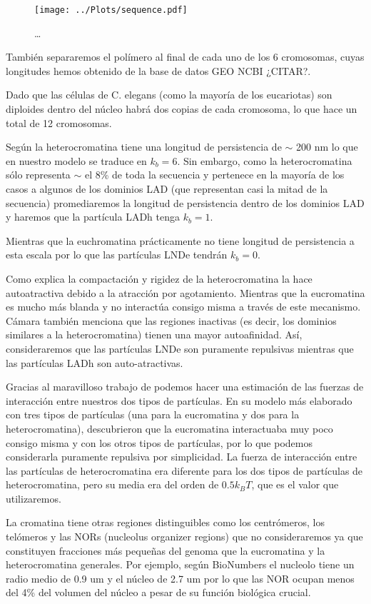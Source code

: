 \begin{figure}
    \centering
    \texttt{[image: ../Plots/sequence.pdf]}
    \caption{\dots}
    \label{fig:sequence}
\end{figure}

También separaremos el polímero al final de cada uno de los 6 cromosomas, cuyas longitudes hemos obtenido de la base de datos GEO NCBI ¿CITAR?.

Dado que las células de C. elegans (como la mayoría de los eucariotas) son diploides dentro del núcleo habrá dos copias de cada cromosoma, lo que hace un total de 12 cromosomas.

Según \cite{Bystricky2004} la heterocromatina tiene una longitud de persistencia de $\sim$ 200 nm lo que en nuestro modelo se traduce en $k_b=6$. Sin embargo, como la heterocromatina sólo representa $\sim$ el 8\% de toda la secuencia y pertenece en la mayoría de los casos a algunos de los dominios LAD (que representan casi la mitad de la secuencia) promediaremos la longitud de persistencia dentro de los dominios LAD y haremos que la partícula LADh tenga $k_b=1$.

Mientras que la euchromatina prácticamente no tiene longitud de persistencia a esta escala por lo que las partículas LNDe tendrán $k_b=0$.

Como explica \cite{Camara2023} la compactación y rigidez de la heterocromatina la hace autoatractiva debido a la atracción por agotamiento. Mientras que la eucromatina es mucho más blanda y no interactúa consigo misma a través de este mecanismo. Cámara también menciona que las regiones inactivas (es decir, los dominios similares a la heterocromatina) tienen una mayor autoafinidad. Así, consideraremos que las partículas LNDe son puramente repulsivas mientras que las partículas LADh son auto-atractivas.

Gracias al maravilloso trabajo de \cite{Falk2019} podemos hacer una estimación de las fuerzas de interacción entre nuestros dos tipos de partículas. En su modelo más elaborado con tres tipos de partículas (una para la eucromatina y dos para la heterocromatina), descubrieron que la eucromatina interactuaba muy poco consigo misma y con los otros tipos de partículas, por lo que podemos considerarla puramente repulsiva por simplicidad. La fuerza de interacción entre las partículas de heterocromatina era diferente para los dos tipos de partículas de heterocromatina, pero su media era del orden de $0.5k_BT$, que es el valor que utilizaremos.

La cromatina tiene otras regiones distinguibles como los centrómeros, los telómeros y las NORs (nucleolus organizer regions) que no consideraremos ya que constituyen fracciones más pequeñas del genoma que la eucromatina y la heterocromatina generales. Por ejemplo, según BioNumbers el nucleolo tiene un radio medio de 0.9 $\text{um}$ y el núcleo de 2.7 $\text{um}$ por lo que las NOR ocupan menos del 4\% del volumen del núcleo a pesar de su función biológica crucial.

